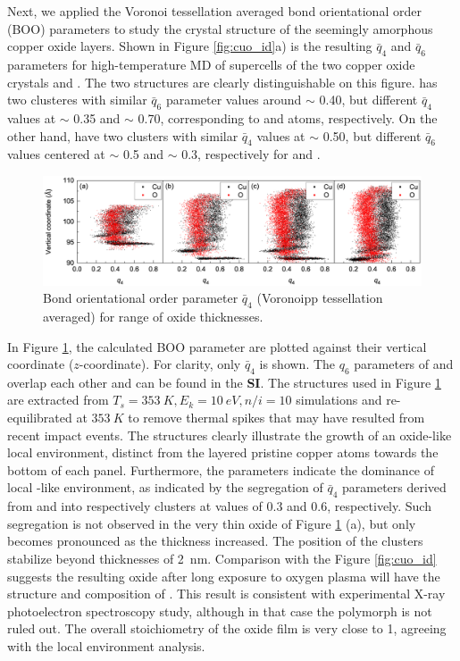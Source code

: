 \documentclass[manuscript=cmatex]{achemso}
\begin{document}
Next, we applied the Voronoi tessellation averaged bond orientational order (BOO) parameters to study the crystal structure of the seemingly amorphous copper oxide layers. Shown in Figure \ref{fig:cuo_id}a) is the resulting $\bar{q}_4$ and $\bar{q}_6$ parameters for high-temperature MD of supercells of the two copper oxide crystals  and . The two structures are clearly distinguishable on this figure.  has two clusteres with similar $\bar{q}_6$ parameter values around $\sim$ 0.40, but different $\bar{q}_4$ values at $\sim$ 0.35 and $\sim$ 0.70, corresponding to  and  atoms, respectively. On the other hand,  have two clusters with similar $\bar{q}_4$ values at $\sim$ 0.50, but different $\bar{q}_6$ values centered at $\sim$ 0.5 and $\sim$ 0.3, respectively for  and . 
\begin{figure}[h]
  \centering
  \includegraphics[width=\textwidth]{boo_1234.eps}
  \caption[Steinhardt's order parameter for slab]{Bond orientational order parameter $\bar{q}_4$ (Voronoipp tessellation averaged) for range of oxide thicknesses. }
  \label{fig:boo_slab}
\end{figure}

In Figure \ref{fig:boo_slab}, the calculated BOO parameter are plotted against their vertical coordinate ($z$-coordinate). For clarity, only $\bar{q}_4$ is shown. The $q_6$ parameters of  and  overlap each other and can be found in the \textbf{SI}. The structures used in Figure \ref{fig:boo_slab} are extracted from $T_s=\SI{353}{K}, E_k=\SI{10}{eV}, n/i = 10$ simulations and re-equilibrated at $\SI{353}{K}$ to remove thermal spikes that may have resulted from recent impact events. The structures clearly illustrate the growth of an oxide-like local environment, distinct from the layered pristine copper atoms towards the bottom of each panel. Furthermore, the parameters indicate the dominance of local -like environment, as indicated by the segregation of $\bar{q}_4$ parameters derived from  and  into respectively clusters at values of 0.3 and 0.6, respectively. Such segregation is not observed in the very thin oxide of Figure \ref{fig:boo_slab} (a), but only becomes pronounced as the thickness increased. The position of the clusters stabilize beyond thicknesses of \SI{2}{nm}. Comparison with the Figure \ref{fig:cuo_id} suggests the resulting oxide after long exposure to oxygen plasma will have the structure and composition of . This result is consistent with experimental X-ray photoelectron spectroscopy study, although in that case the  polymorph is not ruled out. The overall stoichiometry of the oxide film is very close to 1, agreeing with the local environment analysis. 
\end{document}
